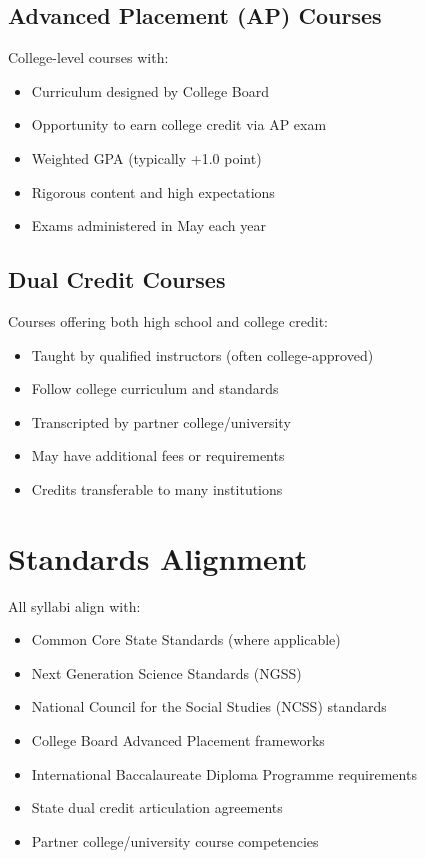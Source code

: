 \documentclass[12pt,oneside]{book}
\begin{document}
\subsection*{Advanced Placement (AP) Courses}
College-level courses with:
\begin{itemize}[leftmargin=2em]
    \item Curriculum designed by College Board
    \item Opportunity to earn college credit via AP exam
    \item Weighted GPA (typically +1.0 point)
    \item Rigorous content and high expectations
    \item Exams administered in May each year
\end{itemize}

\subsection*{Dual Credit Courses}
Courses offering both high school and college credit:
\begin{itemize}[leftmargin=2em]
    \item Taught by qualified instructors (often college-approved)
    \item Follow college curriculum and standards
    \item Transcripted by partner college/university
    \item May have additional fees or requirements
    \item Credits transferable to many institutions
\end{itemize}

\section*{Standards Alignment}
All syllabi align with:
\begin{itemize}[leftmargin=2em]
    \item Common Core State Standards (where applicable)
    \item Next Generation Science Standards (NGSS)
    \item National Council for the Social Studies (NCSS) standards
    \item College Board Advanced Placement frameworks
    \item International Baccalaureate Diploma Programme requirements
    \item State dual credit articulation agreements
    \item Partner college/university course competencies
\end{itemize}
\end{document}
